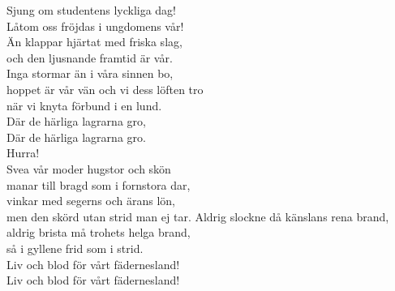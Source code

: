 \documentclass[a6paper, 10pt, twoside]{article}
\begin{document}
\begin{center}
\end{center}
\begin{lyrics}
Sjung om studentens lyckliga dag!\\
Låtom oss fröjdas i ungdomens vår!\\
Än klappar hjärtat med friska slag,\\
och den ljusnande framtid är vår.
\vspace{5pt}\\
Inga stormar än i våra sinnen bo,\\
hoppet är vår vän och vi dess löften tro\\
när vi knyta förbund i en lund.\\
Där de härliga lagrarna gro,\\
Där de härliga lagrarna gro.\\
Hurra!
\vspace{5pt}\\
Svea vår moder hugstor och skön\\
manar till bragd som i fornstora dar,\\
vinkar med segerns och ärans lön,\\
men den skörd utan strid man ej tar.
\newpage
\noindent
Aldrig slockne då känslans rena brand,\\
aldrig brista må trohets helga brand,\\
så i gyllene frid som i strid.\\
Liv och blod för vårt fädernesland!\\
Liv och blod för vårt fädernesland!
\end{lyrics}
\vspace{20pt} 
\end{document}
